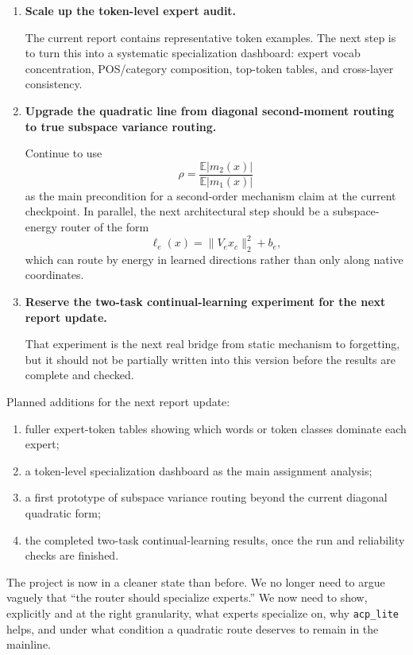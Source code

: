 \documentclass[11pt]{article}
\begin{document}
\begin{enumerate}
    \item \textbf{Scale up the token-level expert audit.}
    
    The current report contains representative token examples. The next step is to turn this into a systematic specialization dashboard: expert vocab concentration, POS/category composition, top-token tables, and cross-layer consistency.

    \item \textbf{Upgrade the quadratic line from diagonal second-moment routing to true subspace variance routing.}

    Continue to use
    \[
    \rho
    =
    \frac{\mathbb{E}|m_2(x)|}{\mathbb{E}|m_1(x)|}
    \]
    as the main precondition for a second-order mechanism claim at the current checkpoint. In parallel, the next architectural step should be a subspace-energy router of the form
    \[
    \ell_e(x)=\|V_e x_c\|_2^2+b_e,
    \]
    which can route by energy in learned directions rather than only along native coordinates.

    \item \textbf{Reserve the two-task continual-learning experiment for the next report update.}

    That experiment is the next real bridge from static mechanism to forgetting, but it should not be partially written into this version before the results are complete and checked.
\end{enumerate}

Planned additions for the next report update:
\begin{enumerate}
    \item fuller expert-token tables showing which words or token classes dominate each expert;
    \item a token-level specialization dashboard as the main assignment analysis;
    \item a first prototype of subspace variance routing beyond the current diagonal quadratic form;
    \item the completed two-task continual-learning results, once the run and reliability checks are finished.
\end{enumerate}

The project is now in a cleaner state than before. We no longer need to argue vaguely that ``the router should specialize experts.'' We now need to show, explicitly and at the right granularity, what experts specialize on, why \texttt{acp\_lite} helps, and under what condition a quadratic route deserves to remain in the mainline.
\end{document}
